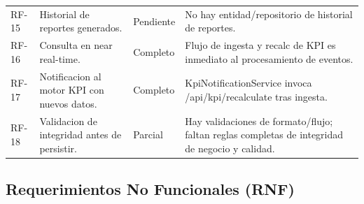 \documentclass[12pt,a4paper]{article}
\begin{document}
\begin{longtable}{p{1.5cm}p{6.4cm}p{2.3cm}p{3.6cm}}
RF-15 & Historial de reportes generados. & Pendiente & No hay entidad/repositorio de historial de reportes. \\
RF-16 & Consulta en near real-time. & Completo & Flujo de ingesta y recalc de KPI es inmediato al procesamiento de eventos. \\
RF-17 & Notificacion al motor KPI con nuevos datos. & Completo & KpiNotificationService invoca /api/kpi/recalculate tras ingesta. \\
RF-18 & Validacion de integridad antes de persistir. & Parcial & Hay validaciones de formato/flujo; faltan reglas completas de integridad de negocio y calidad. \\
\bottomrule
\end{longtable}

\subsection{Requerimientos No Funcionales (RNF)}
\end{document}
